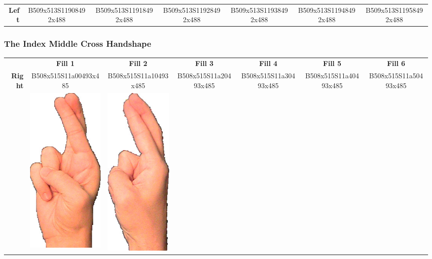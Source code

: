 \documentclass{article}
\begin{document}
\begin{center}
\begin{tabular}{r*{6}{c}}
\textbf{Left}&
B509x513S11908492x488&
B509x513S11918492x488&
B509x513S11928492x488&
B509x513S11938492x488&
B509x513S11948492x488&
B509x513S11958492x488\\
\end{tabular}
\end{center}

\subsubsection{The Index Middle Cross Handshape}

\begin{center}
\begin{tabular}{r*{6}{c}}
&\textbf{Fill 1}&\textbf{Fill 2}&\textbf{Fill 3}&\textbf{Fill 4}&\textbf{Fill 5}&\textbf{Fill 6}\\
\multirow{2}{*}{\textbf{Right}}&
B508x515S11a00493x485&
B508x515S11a10493x485&
B508x515S11a20493x485&
B508x515S11a30493x485&
B508x515S11a40493x485&
B508x515S11a50493x485\\
&
\includegraphics[scale=0.1]{images/02-06-1.jpg}&
\includegraphics[scale=0.1]{images/02-06-2.jpg}&

\end{tabular}
\end{center}
\end{document}
